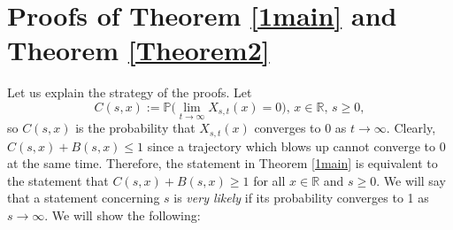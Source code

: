 \documentclass[sn-mathphys-num]{sn-jnl}
\theoremstyle{definition}
\numberwithin{equation}{section} \theoremstyle{remark}
\def\R{\mathbb R}
\def\P{\mathbb P}
\newcommand{\1}{\mathbbm{1}}
\begin{document}
\section{Proofs of Theorem \ref{1main} and Theorem \ref{Theorem2}}

Let us explain the strategy of the proofs. Let
$$
C(s,x):=\P\Big( \lim_{t \to \infty}X_{s,t}(x)=0\Big),\,x\in \R,\,s \geq 0,
$$
so $C(s,x)$ is the probability that $X_{s,t}(x)$ converges to 0 as
$t \to \infty$.  Clearly, $C(s,x)+B(s,x)\leq 1$ since a trajectory
which blows up cannot converge to 0 at the same time. Therefore, the
statement in Theorem \ref{1main} is equivalent to the statement that
$C(s,x)+B(s,x)\geq 1$ for all $x \in \R$ and $s \geq 0$.  We will say
that a statement concerning $s$ is {\em very likely} if its
probability converges to 1 as $s \to \infty$. We will show the
following:
\end{document}
